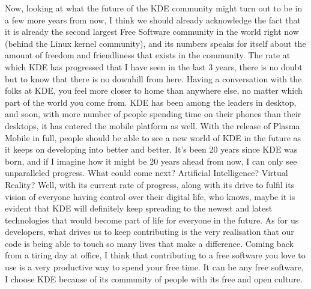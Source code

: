 Now, looking at what the future of the KDE community might turn out to be in a few more years from now, I think we should already acknowledge the fact that it is already the second largest Free Software community in the world right now (behind the Linux kernel community), and its numbers speaks for itself about the amount of freedom and friendliness that exists in the community. The rate at which KDE has progressed that I have seen in the last 3 years, there is no doubt but to know that there is no downhill from here. Having a conversation with the folks at KDE, you feel more closer to home than anywhere else, no matter which part of the world you come from. KDE has been among the leaders in desktop, and soon, with more number of people spending time on their phones than their desktops, it has entered the mobile platform as well. With the release of Plasma Mobile in full, people should be able to see a new world of KDE in the future as it keeps on developing into better and better. It's been 20 years since KDE was born, and if I imagine how it might be 20 years ahead from now, I can only see unparalleled progress. What could come next? Artificial Intelligence? Virtual Reality? Well, with its current rate of progress, along with its drive to fulfil its vision of everyone having control over their digital life, who knows, maybe it is evident that KDE will definitely keep spreading to the newest and latest technologies that would become part of life for everyone in the future. As for us developers, what drives us to keep contributing is the very realisation that our code is being able to touch so many lives that make a difference. Coming back from a tiring day at office, I think that contributing to a free software you love to use is a very productive way to spend your free time. It can be any free software, I choose KDE because of its community of people with its free and open culture.